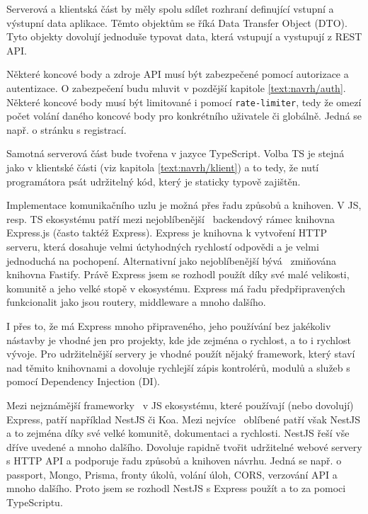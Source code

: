Serverová a klientská část by měly spolu sdílet rozhraní definující vstupní a výstupní data aplikace.
Těmto objektům se říká Data Transfer Object (DTO).
Tyto objekty dovolují jednoduše typovat data, která vstupují a vystupují z REST API.

Některé koncové body a zdroje API musí být zabezpečené pomocí autorizace a autentizace. 
O zabezpečení budu mluvit v pozdější kapitole \ref{text:navrh/auth}.
Některé koncové body musí být limitované i pomocí \verb|rate-limiter|, tedy že omezí počet volání daného koncové body pro konkrétního uživatele či globálně.
Jedná se např. o stránku s registrací.

Samotná serverová část bude tvořena v jazyce TypeScript.
Volba TS je stejná jako v klientské části (viz kapitola \ref{text:navrh/klient}) a to tedy, že nutí programátora psát udržitelný kód, který je staticky typově zajištěn.

Implementace komunikačního uzlu je možná přes řadu způsobů a knihoven.
V JS, resp. TS ekosystému patří mezi nejoblíbenější~\cite{brown2019web} backendový rámec knihovna Express.js (často taktéž Express).
Express je knihovna k vytvoření HTTP serveru, která dosahuje velmi úctyhodných rychlostí odpovědi a je velmi jednoduchá na pochopení.
Alternativní jako nejoblíbenější bývá~\cite{poreba_2023} zmiňována knihovna Fastify.
Právě Express jsem se rozhodl použít díky své malé velikosti, komunitě a jeho velké stopě v ekosystému.
Express má řadu předpřipravených funkcionalit jako jsou routery, middleware a mnoho dalšího.

I přes to, že má Express mnoho připraveného, jeho používání bez jakékoliv nástavby je vhodné jen pro projekty, kde jde zejména o rychlost, a to i rychlost vývoje.
Pro udržitelnější servery je vhodné použít nějaký framework, který staví nad těmito knihovnami a dovoluje rychlejší zápis kontrolérů, modulů a služeb s pomocí Dependency Injection (DI).

Mezi nejznámější frameworky~\cite{uzayr2022frontend, nest} v JS ekosystému, které používají (nebo dovolují) Express, patří například NestJS či Koa.
Mezi nejvíce~\cite{nest} oblíbené patří však NestJS a to zejména díky své velké komunitě, dokumentaci a rychlosti.
NestJS řeší vše dříve uvedené a mnoho dalšího.
Dovoluje rapidně tvořit udržitelné webové servery s HTTP API a podporuje řadu způsobů a knihoven návrhu.
Jedná se např. o passport, Mongo, Prisma, fronty úkolů, volání úloh, CORS, verzování API a mnoho dalšího.
Proto jsem se rozhodl NestJS s Express použít a to za pomoci TypeScriptu.

